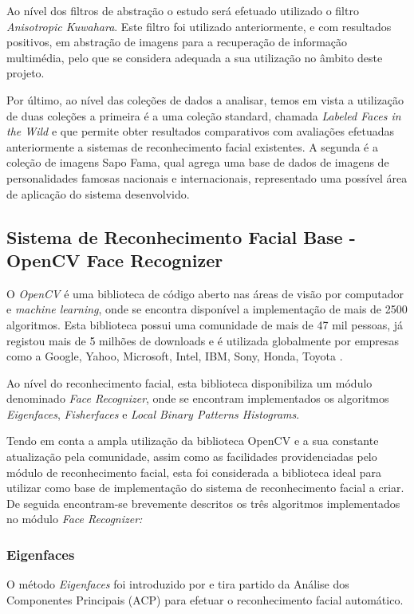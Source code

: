 Ao nível dos filtros de abstração o estudo será efetuado utilizado o filtro \textit{Anisotropic Kuwahara}.
Este filtro foi utilizado anteriormente, e com resultados positivos, em abstração de imagens para a recuperação de informação multimédia, pelo que se considera adequada a sua utilização no âmbito deste projeto.

Por último, ao nível das coleções de dados a analisar, temos em vista a utilização de duas coleções a primeira é a uma coleção standard, chamada \textit{Labeled Faces in the Wild} e que permite obter resultados comparativos com avaliações efetuadas anteriormente a sistemas de reconhecimento facial existentes. A segunda é a coleção de imagens Sapo Fama, qual agrega uma base de dados de imagens de personalidades famosas nacionais e internacionais, representado uma possível área de aplicação do sistema desenvolvido.
	
\subsection{Sistema de Reconhecimento Facial Base - OpenCV Face Recognizer}
O \textit{OpenCV} é uma biblioteca de código aberto nas áreas de visão por computador e \textit{machine learning}, onde se encontra disponível a implementação de mais de 2500 algoritmos. Esta biblioteca possui uma comunidade de mais de 47 mil pessoas, já registou mais de 5 milhões de downloads e é utilizada globalmente por empresas como a Google, Yahoo, Microsoft, Intel, IBM, Sony, Honda, Toyota \cite{Team}. 

Ao nível do reconhecimento facial, esta biblioteca disponibiliza um módulo denominado \textit{Face Recognizer}, onde se encontram implementados os algoritmos \textit{Eigenfaces}, \textit{Fisherfaces} e \textit{Local Binary Patterns Histograms}.

Tendo em conta a ampla utilização da biblioteca OpenCV e a sua constante atualização pela comunidade, assim como as facilidades providenciadas pelo módulo de reconhecimento facial, esta foi considerada a biblioteca ideal para utilizar como base de implementação do sistema de reconhecimento facial a criar. De seguida encontram-se brevemente descritos os três algoritmos implementados no módulo \textit{Face Recognizer:}

\subsubsection{Eigenfaces}
O método \textit{Eigenfaces} foi introduzido por \cite{Belhumeur1997} e tira partido da Análise dos Componentes Principais (ACP) para efetuar o reconhecimento facial automático.

